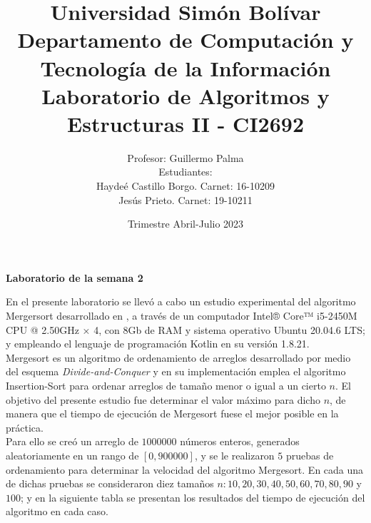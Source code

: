 \documentclass{article}
\begin{document}
	\title{\normalsize{Universidad Sim\'on Bol\'ivar\\
			Departamento de Computaci\'on y Tecnolog\'ia de la Informaci\'on\\
			Laboratorio de Algoritmos y Estructuras II - CI2692}}
	\author{\normalsize{Profesor: Guillermo Palma}\\
		\normalsize{Estudiantes:}\\
		\normalsize{Hayde\'e Castillo Borgo. Carnet: 16-10209}\\
		\normalsize{Jes\'us Prieto. Carnet: 19-10211}}
	\date{\normalsize{Trimestre Abril-Julio 2023}}
	\maketitle
	\begin{center}
		\Large{\textbf{Laboratorio de la semana 2}}
	\end{center}\:
	
	En el presente laboratorio se llev\'o a cabo un estudio experimental del algoritmo Mergersort desarrollado en \cite{1}, a trav\'es de un computador Intel® Core™ i5-2450M CPU @ 2.50GHz × 4, con 8Gb de RAM y sistema operativo Ubuntu 20.04.6 LTS; y empleando el lenguaje de programaci\'on Kotlin en su versi\'on 1.8.21.\\
	
	Mergesort es un algoritmo de ordenamiento de arreglos desarrollado por medio del esquema \textit{Divide-and-Conquer} y en su implementaci\'on emplea el algoritmo Insertion-Sort para ordenar arreglos de tamaño menor o igual a un cierto $n$. El objetivo del presente estudio fue determinar el valor m\'aximo para dicho $n$, de manera que el tiempo de ejecuci\'on de Mergesort fuese el mejor posible en la pr\'actica.\\
	
	Para ello se creó un arreglo de $1000000$ n\'umeros enteros, generados aleatoriamente en un rango de $[0,900000]$, y se le realizaron $5$ pruebas de ordenamiento para determinar la velocidad del algoritmo Mergesort. En cada una de dichas pruebas se consideraron diez tamaños $n: 10, 20, 30, 40, 50, 60, 70, 80, 90$ y $100$; y en la siguiente tabla se presentan los resultados del tiempo de ejecuci\'on del algoritmo en cada caso.
\end{document}
